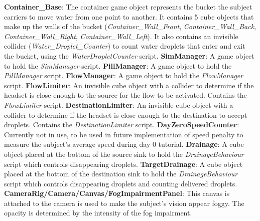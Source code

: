 \documentclass{article}
\begin{document}
\textbf{Container\_Base}: The container game object represents the bucket the subject carriers to move water from one point to another. It contains 5 cube objects that make up the walls of the bucket (\textit{Container\_Wall\_Front}, \textit{Container\_Wall\_Back}, \textit{Container\_Wall\_Right}, \textit{Container\_Wall\_Left}). It also contains an invisible collider (\textit{Water\_Droplet\_Counter}) to count water droplets that enter and exit the bucket, using the \textit{WaterDropletCounter} script.\newline \newline
\textbf{SimManager}: A game object to hold the \textit{SimManager} script.\newline \newline
\textbf{PillManager}: A game object to hold the \textit{PillManager} script.\newline \newline
\textbf{FlowManager}: A game object to hold the \textit{FlowManager} script.\newline \newline
\textbf{FlowLimiter}: An invisible cube object with a collider to determine if the headset is close enough to the source for the flow to be activated. Contains the \textit{FlowLimiter} script.\newline \newline
\textbf{DestinationLimiter}: An invisible cube object with a collider to determine if the headset is close enough to the destination to accept droplets. Contains the \textit{DestinationLimiter} script.\newline \newline
\textbf{DayZeroSpeedCounter}: Currently not in use, to be used in future implementation of speed penalty to measure the subject's average speed during day 0 tutorial.\newline \newline
\textbf{Drainage}: A cube object placed at the bottom of the source sink to hold the \textit{DrainageBehaviour} script which controls disappearing droplets.
\textbf{TargetDrainage}: A cube object placed at the bottom of the destination sink to hold the \textit{DrainageBehaviour} script which controls disappearing droplets and counting delivered droplets.\newline \newline
\textbf{CameraRig/Camera/Canvas/FogImpairmentPanel}: This canvas is attached to the camera is used to make the subject's vision appear foggy. The opacity is determined by the intensity of the fog impairment.\newline \newline
\end{document}
